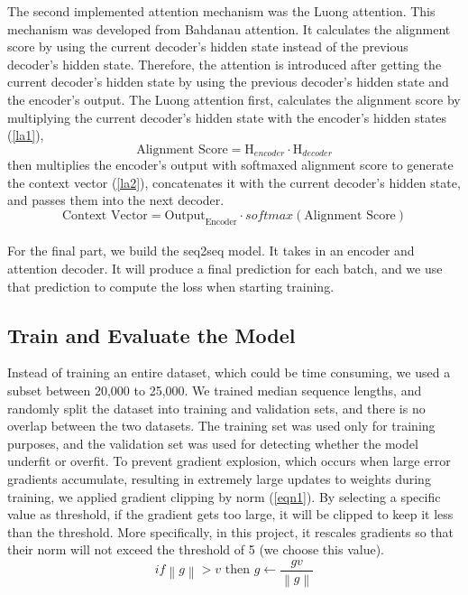 \documentclass[conference]{IEEEtran}
\begin{document}
\indent The second implemented attention mechanism was the Luong attention. This mechanism was developed from Bahdanau attention. It calculates the alignment score by using the current decoder’s hidden state instead of the previous decoder’s hidden state. Therefore, the attention is introduced after getting the current decoder’s hidden state by using the previous decoder’s hidden state and the encoder’s output. The Luong attention first, calculates the alignment score by multiplying the current decoder’s hidden state with the encoder’s hidden states (\ref{la1}),
\begin{equation}
    \label{la1}
    \text{Alignment Score} = \mathrm{H}_{encoder}^{} \cdot \mathrm{H}_{decoder}^{}
\end{equation}  
then multiplies the encoder's output with softmaxed alignment score to generate the context vector (\ref{la2}), concatenates it with the current decoder’s hidden state, and passes them into the next decoder.
\begin{equation}
    \label{la2}
    \text{Context Vector} = \mathrm{Output}_{\text{Encoder}}^{} \cdot softmax(\text{Alignment Score})
\end{equation}  
\\
\indent For the final part, we build the seq2seq model. It takes in an encoder and attention decoder. It will produce a final prediction for each batch, and we use that prediction to compute the loss when starting training. 

\subsection{Train and Evaluate the Model}
Instead of training an entire dataset, which could be time consuming, we used a subset between 20,000 to 25,000. We trained median sequence lengths, and randomly split the dataset into training and validation sets, and there is no overlap between the two datasets. The training set was used only for training purposes, and the validation set was used for detecting whether the model underfit or overfit. To prevent gradient explosion, which occurs when large error gradients accumulate, resulting in extremely large updates to weights during training, we applied gradient clipping by norm (\ref{eqn1}). By selecting a specific value as threshold, if the gradient gets too large, it will be clipped to keep it less than the threshold. More specifically, in this project, it rescales gradients so that their norm will not exceed the threshold of 5 (we choose this value).
\begin{equation}
    \label{eqn1}

    if \left\| g \right\|\gt v \text{ then } g \gets \frac{gv}{\left\| g \right\|}
\end{equation}    
\end{document}
